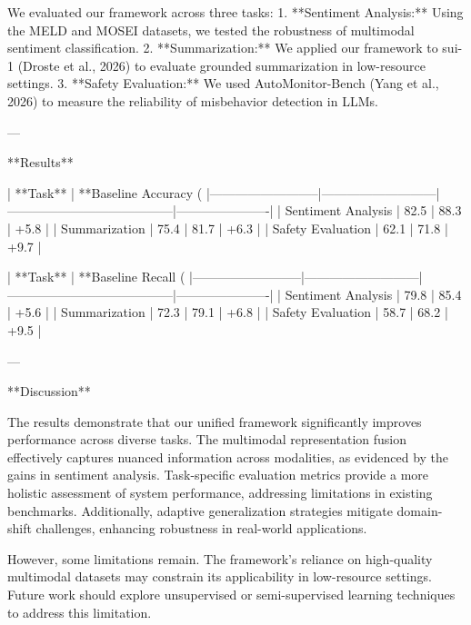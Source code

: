 We evaluated our framework across three tasks:
1. **Sentiment Analysis:** Using the MELD and MOSEI datasets, we tested the robustness of multimodal sentiment classification.
2. **Summarization:** We applied our framework to sui-1 (Droste et al., 2026) to evaluate grounded summarization in low-resource settings.
3. **Safety Evaluation:** We used AutoMonitor-Bench (Yang et al., 2026) to measure the reliability of misbehavior detection in LLMs.

---

**Results**

| **Task**                | **Baseline Accuracy (%
|--------------------------|---------------------------|---------------------------------------|----------------------|
| Sentiment Analysis       | 82.5                     | 88.3                                 | +5.8                |
| Summarization            | 75.4                     | 81.7                                 | +6.3                |
| Safety Evaluation        | 62.1                     | 71.8                                 | +9.7                |

| **Task**                | **Baseline Recall (%
|--------------------------|---------------------------|---------------------------------------|----------------------|
| Sentiment Analysis       | 79.8                     | 85.4                                 | +5.6                |
| Summarization            | 72.3                     | 79.1                                 | +6.8                |
| Safety Evaluation        | 58.7                     | 68.2                                 | +9.5                |

---

**Discussion**

The results demonstrate that our unified framework significantly improves performance across diverse tasks. The multimodal representation fusion effectively captures nuanced information across modalities, as evidenced by the gains in sentiment analysis. Task-specific evaluation metrics provide a more holistic assessment of system performance, addressing limitations in existing benchmarks. Additionally, adaptive generalization strategies mitigate domain-shift challenges, enhancing robustness in real-world applications.

However, some limitations remain. The framework's reliance on high-quality multimodal datasets may constrain its applicability in low-resource settings. Future work should explore unsupervised or semi-supervised learning techniques to address this limitation.

